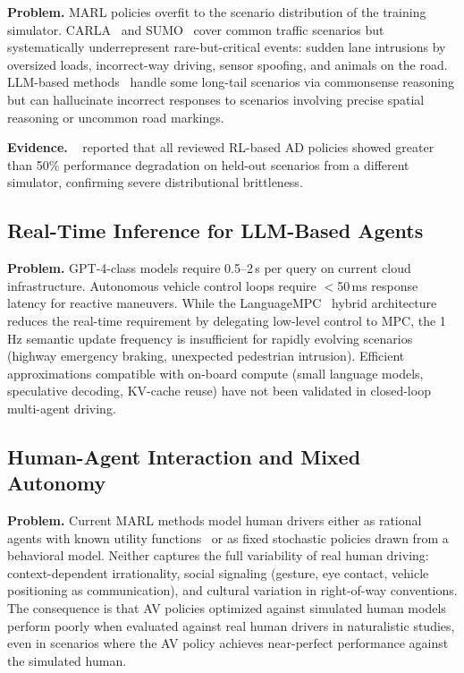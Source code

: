 \documentclass[12pt, a4paper]{article}
\begin{document}
\textbf{Problem.}  MARL policies overfit to the scenario distribution of
the training simulator.  CARLA~\cite{dosovitskiy2017carlaopenurbandriving}
and SUMO~\cite{krajzewicz2012recent} cover common traffic scenarios but
systematically underrepresent rare-but-critical events: sudden lane intrusions
by oversized loads, incorrect-way driving, sensor spoofing, and animals on
the road.  LLM-based methods~\cite{fu2023drive} handle some long-tail scenarios
via commonsense reasoning but can hallucinate incorrect responses to scenarios
involving precise spatial reasoning or uncommon road markings.

\textbf{Evidence.}  \citeauthor{kiran2021deep}~\cite{kiran2021deep} reported
that all reviewed RL-based AD policies showed greater than 50\% performance
degradation on held-out scenarios from a different simulator, confirming
severe distributional brittleness.

\subsection{Real-Time Inference for LLM-Based Agents}
\label{sec:ch_latency}

\textbf{Problem.}  GPT-4-class models require 0.5--2\,s per query on
current cloud infrastructure.  Autonomous vehicle control loops require
$<$50\,ms response latency for reactive maneuvers.  While the
LanguageMPC~\cite{sha2023languagempc} hybrid architecture reduces the real-time
requirement by delegating low-level control to MPC, the 1\,Hz semantic
update frequency is insufficient for rapidly evolving scenarios (highway
emergency braking, unexpected pedestrian intrusion).  Efficient approximations
compatible with on-board compute (small language models, speculative decoding,
KV-cache reuse) have not been validated in closed-loop multi-agent driving.

\subsection{Human-Agent Interaction and Mixed Autonomy}
\label{sec:ch_human}

\textbf{Problem.}  Current MARL methods model human drivers either as
rational agents with known utility functions~\cite{sadigh2016planning} or
as fixed stochastic policies drawn from a behavioral model.  Neither
captures the full variability of real human driving: context-dependent
irrationality, social signaling (gesture, eye contact, vehicle positioning
as communication), and cultural variation in right-of-way conventions.
The consequence is that AV policies optimized against simulated human
models perform poorly when evaluated against real human drivers in naturalistic
studies, even in scenarios where the AV policy achieves near-perfect
performance against the simulated human.
\end{document}
